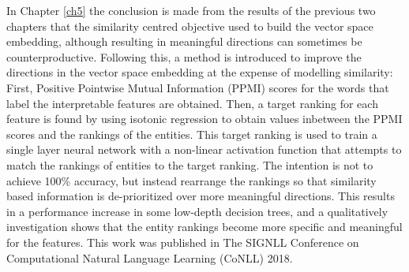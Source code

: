 In Chapter \ref{ch5} the conclusion is made from the results of the previous two chapters that the similarity centred objective used to build the vector space embedding, although resulting in meaningful directions can sometimes be counterproductive. Following this, a method is introduced to improve the directions in the vector space embedding at the expense of modelling similarity: First, Positive Pointwise Mutual Information (PPMI) scores for the words that label the interpretable features are obtained. Then, a target ranking for each feature is found by using isotonic regression to obtain values inbetween the PPMI scores and the rankings of the entities. This target ranking is used to train a single layer neural network with a non-linear activation function that attempts to match the rankings of entities to the target ranking. The intention is not to achieve 100\% accuracy, but instead rearrange the rankings so that similarity based information is de-prioritized over more meaningful directions. This results in a performance increase in some low-depth decision trees,  and a qualitatively investigation shows that the entity rankings become more specific and meaningful for the features. This work was published in The SIGNLL Conference on Computational Natural Language Learning (CoNLL) 2018.






